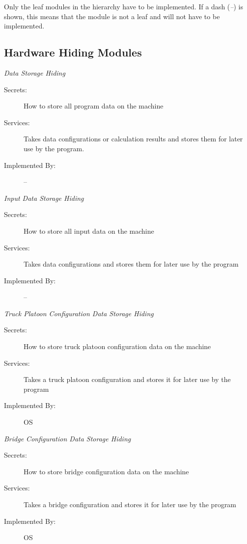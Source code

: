 \documentclass[12pt, titlepage]{article}
\begin{document}
Only the leaf modules in the hierarchy have to be implemented. If a dash
(\emph{--}) is shown, this means that the module is not a leaf and will not have
to be implemented.

\subsection{Hardware Hiding Modules}
  \hypertarget{DSH}{\emph{{\large Data Storage Hiding}}}
    \begin{description}
        \item[Secrets:] How to store all program data on the machine
        \item[Services:]Takes data configurations or calculation results and stores them for later use by the program.
        \item[Implemented By:] -- \\
    \end{description}
      \hypertarget{IDSH}{\emph{{\large Input Data Storage Hiding}}}
    \begin{description}
        \item[Secrets:] How to store all input data on the machine
        \item[Services:] Takes data configurations and stores them for later use by the program
        \item[Implemented By:] -- \\
    \end{description}
      \hypertarget{TPCDSH}{\emph{{\large Truck Platoon Configuration Data Storage Hiding}}}
    \begin{description}
        \item[Secrets:] How to store truck platoon configuration data on the machine
        \item[Services:]Takes a truck platoon configuration and stores it for later use by the program
        \item[Implemented By:] OS\\
    \end{description}
      \hypertarget{BCDSH}{\emph{{\large Bridge Configuration Data Storage Hiding}}}
    \begin{description}
        \item[Secrets:] How to store bridge configuration data on the machine
        \item[Services:]Takes a bridge configuration and stores it for later use by the program
        \item[Implemented By:] OS\\
    \end{description}
\end{document}
